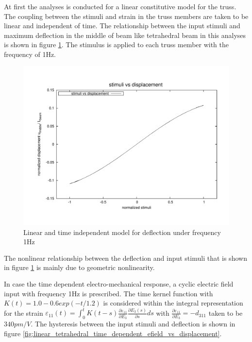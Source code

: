 At first the analyses is conducted for a linear constitutive model for the truss.
The coupling between the stimuli and strain in the truss members are taken to be linear and independent of time.
The relationship between the input stimuli and maximum deflection in the middle of beam like tetrahedral beam in this analyses is shown in figure \ref{fig:linear_static_stimuli_vs_displacement}.
The stimulus is applied to each truss member with the frequency of 1Hz.
\begin{figure} 
\centering
\includegraphics[width=6.0in]{./chap_5_active_trusses/images_non_linear_time_dependent_constitutive_equatio/linear_static_stimuli_vs_displacement.pdf}
\caption{Linear and time independent model for deflection under frequency 1Hz}
\label{fig:linear_static_stimuli_vs_displacement}
\end{figure} 
The nonlinear relationship between the deflection and input stimuli that is shown in figure \ref{fig:linear_static_stimuli_vs_displacement} is mainly due to geometric nonlinearity.

In case the time dependent electro-mechanical response, a cyclic electric field input with frequency 1Hz is prescribed.
The time kernel function with 
$K(t)=1.0-0.6 exp(-t/1.2)$ is considered within the integral representation for the strain 
$\varepsilon_{11}(t)=\int_0^t
K(t-s)\frac{\partial \varepsilon_{11}}{\partial E_3}\frac{\partial
E_3(s)}{\partial s} ds$ 
with 
$\frac{\partial \varepsilon_{11}}{\partial
E_3}=-d_{311}$ 
taken to be 
$340 pm/V$.
The hysteresis between the input stimuli and deflection is shown in figure \ref{fig:linear_tetrahedral_time_dependent_efield_vs_displacement}.


